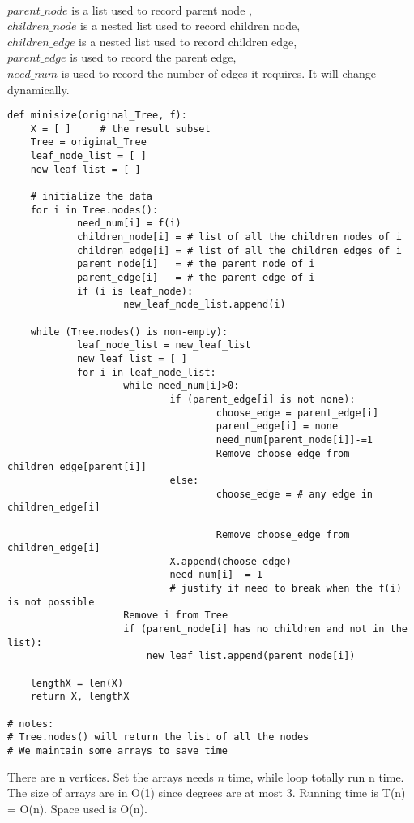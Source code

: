 \documentclass[12pt,a4paper]{article}
\newcommand{\question}[1]{\bigskip\noindent{\textbf{Q{#1} solution}}}
\begin{document}
\noindent
\\$parent\_node$ is a list used to record parent node , 
\\$children\_node$ is a nested list used to record children node, 
\\$children\_edge$ is a nested list used to record children edge, 
\\$parent\_edge$ is used to record the parent edge, 
\\$need\_num$ is used to record the number of edges it requires. It will change dynamically.


\begin{lstlisting}
def minisize(original_Tree, f):
	X = [ ]		# the result subset
	Tree = original_Tree
	leaf_node_list = [ ]
	new_leaf_list = [ ]

	# initialize the data
	for i in Tree.nodes():
		  	need_num[i] = f(i)
			children_node[i] = # list of all the children nodes of i
			children_edge[i] = # list of all the children edges of i
			parent_node[i]   = # the parent node of i
			parent_edge[i]   = # the parent edge of i
			if (i is leaf_node):
					new_leaf_node_list.append(i)

	while (Tree.nodes() is non-empty):
			leaf_node_list = new_leaf_list
			new_leaf_list = [ ]
			for i in leaf_node_list:  
					while need_num[i]>0:
							if (parent_edge[i] is not none):
									choose_edge = parent_edge[i]
									parent_edge[i] = none
									need_num[parent_node[i]]-=1
									Remove choose_edge from children_edge[parent[i]] 
							else:
									choose_edge = # any edge in children_edge[i]

							    	Remove choose_edge from children_edge[i]
							X.append(choose_edge)
							need_num[i] -= 1
							# justify if need to break when the f(i) is not possible
					Remove i from Tree
					if (parent_node[i] has no children and not in the list):
						new_leaf_list.append(parent_node[i])
			
	lengthX = len(X)
	return X, lengthX

# notes:
# Tree.nodes() will return the list of all the nodes
# We maintain some arrays to save time

\end{lstlisting}
There are n vertices. Set the arrays needs $n$ time, while loop totally run n time. The size of arrays are in O(1) since degrees are at most 3. Running time is T(n) = O(n). Space used is O(n).\\

\question{21.A}
\end{document}
